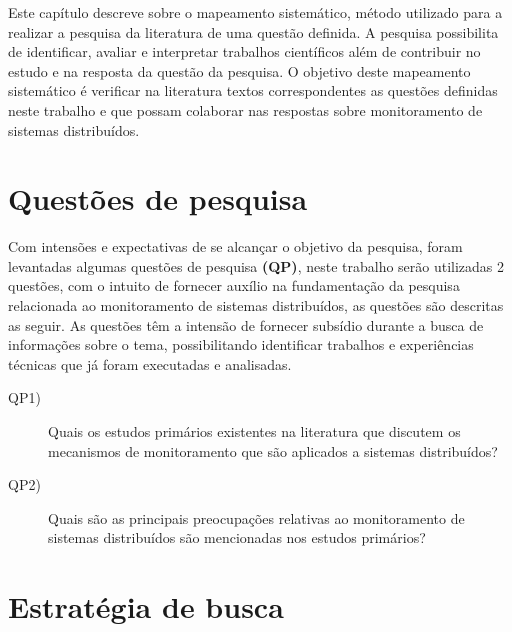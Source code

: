 \label{mapeamento_sistematico}

Este capítulo descreve sobre o mapeamento sistemático, método utilizado para a realizar a pesquisa da literatura de uma questão definida. A pesquisa possibilita de identificar, avaliar e interpretar trabalhos científicos além de contribuir no estudo e na resposta da questão da pesquisa\cite{kitchenham2007guidelines,petticrew2008systematic,de2018mapeamento}. O objetivo deste mapeamento sistemático é verificar na literatura textos correspondentes as questões definidas neste trabalho e que possam colaborar nas respostas sobre monitoramento de sistemas distribuídos.


\section{Questões de pesquisa}
\label{questoes1e2}

Com intensões e expectativas de se alcançar o objetivo da pesquisa, foram levantadas algumas questões de pesquisa \textbf{(QP)}, neste trabalho serão utilizadas 2 questões, com o intuito de fornecer auxílio na fundamentação da pesquisa relacionada ao monitoramento de sistemas distribuídos, as questões são descritas as seguir. As questões têm a intensão de fornecer subsídio durante a busca de informações sobre o tema, possibilitando identificar trabalhos e experiências técnicas que já foram executadas e analisadas\cite{feltrim2004abordagem}.

\begin{description}
\item[QP1)] Quais os estudos primários existentes na literatura que discutem os mecanismos de monitoramento 
que são aplicados a sistemas distribuídos?
\item[QP2)] Quais são as principais preocupações relativas ao monitoramento de sistemas distribuídos são mencionadas nos estudos primários?
\end{description}


\section{Estratégia de busca}
\label{sec:stringbusca}

